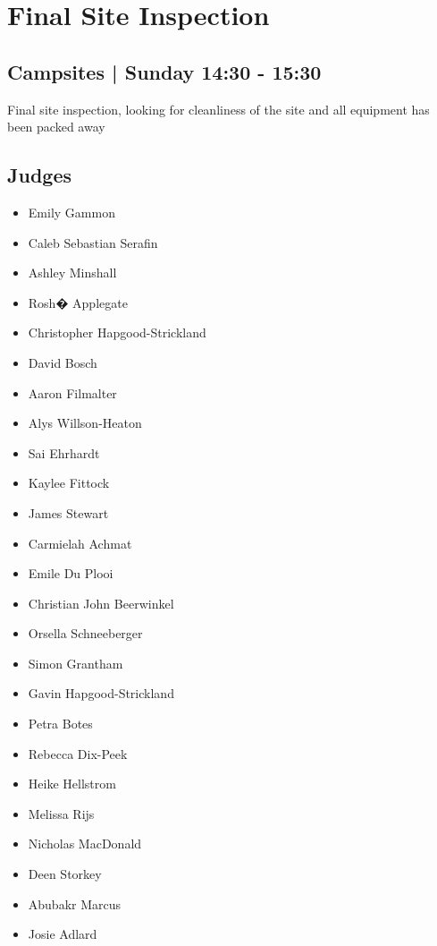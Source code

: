 \documentclass[10pt]{article}
\begin{document}
		\begin{minipage}{\linewidth}
		\setcounter{section}{48}
	\section{Final Site Inspection }
	\subsection*{Campsites | Sunday 14:30 - 15:30}

	Final site inspection, looking for cleanliness of the site and all equipment has been packed away

	\begin{multicols}{2}
	\subsection*{\faUsers \: Judges}
	\begin{itemize}
			\item Emily Gammon
			\item Caleb Sebastian Serafin
			\item Ashley Minshall
			\item Rosh� Applegate
			\item Christopher Hapgood-Strickland
			\item David Bosch
			\item Aaron Filmalter
			\item Alys Willson-Heaton
			\item Sai Ehrhardt
			\item Kaylee Fittock
			\item James Stewart
			\item Carmielah Achmat
			\item Emile Du Plooi
			\item Christian John Beerwinkel
			\item Orsella Schneeberger
			\item Simon Grantham
			\item Gavin Hapgood-Strickland
			\item Petra Botes
			\item Rebecca Dix-Peek
			\item Heike Hellstrom
			\item Melissa Rijs
			\item Nicholas MacDonald
			\item Deen Storkey
			\item Abubakr Marcus
			\item Josie Adlard

\end{itemize}
\end{multicols}
\end{minipage}
\end{document}
